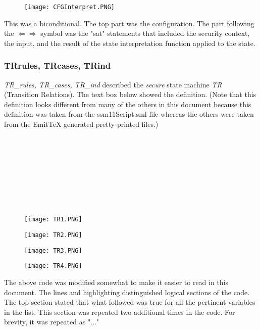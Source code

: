   \begin{figure}[h]
  \centering
  \texttt{[image: CFGInterpret.PNG]}
\end{figure}

 This was a biconditional.  The top part was the configuration.   The part following
  the $\Leftarrow \Rightarrow$ symbol was the "sat" statements that included the security context, the input,
  and the result of the state interpretation function applied to the state.


 \subsubsection{TR\textunderscore rules, TR\textunderscore cases, TR\textunderscore ind}
\label{sec:trtext-rules-trtext}


  \textit{TR_rules, TR_cases, TR_ind} described the \textit{secure} state machine \textit{TR}
  (Transition Relations).  The text box below showed the definition.  (Note that this definition
  looks different from many of the others in this document because this definition was taken from
  the ssm11Script.sml file whereas the others were taken from the EmitTeX generated pretty-printed files.)\\\\\\
  \\\\\\\\\\\\
  \begin{figure}[h!]
  \centering
  \texttt{[image: TR1.PNG]}
\end{figure}

\begin{figure}[h!]
  \centering
  \texttt{[image: TR2.PNG]}
\end{figure}
\begin{figure}[h!]
  \centering
  \texttt{[image: TR3.PNG]}
\end{figure}
\begin{figure}[h!]
  \centering
  \texttt{[image: TR4.PNG]}
\end{figure}
 The above code was modified somewhat to make it easier to read in this document.
  The lines and highlighting distinguished logical sections of the code.  The top section
  stated that what followed was true for all the pertinent variables in the list.  This
  section was repeated two additional times in the code.  For brevity, it was repeated as "..."\\
  
